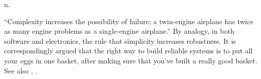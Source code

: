  n.

``Complexity increases the possibility of failure; a twin-engine airplane has twice as many engine problems as a single-engine airplane.''
By analogy, in both software and electronics, the rule that simplicity increases robustness. It is correspondingly argued that the right way
to build reliable systems is to put all your eggs in one basket, after making sure that you've built a really good basket. See also
, .

